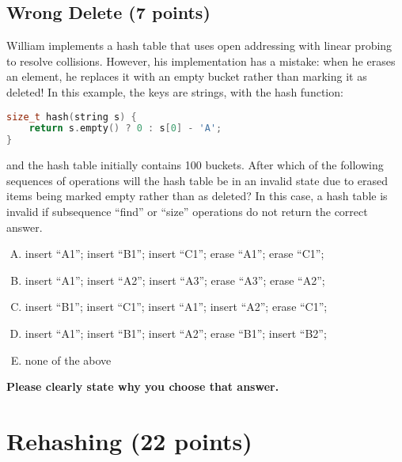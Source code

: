 \documentclass[11pt]{exam}
\begin{document}
\begin{solution}
\end{solution}

\subsection{Wrong Delete (7 points)}
William implements a hash table that uses open addressing with linear probing to resolve collisions. However, his implementation has a mistake: when he erases an element, he replaces it with an empty bucket rather than marking it as deleted! In this example, the keys are strings, with the hash function:
\begin{lstlisting}[language=c++]
size_t hash(string s) {
	return s.empty() ? 0 : s[0] - 'A';
}
\end{lstlisting}

and the hash table initially contains 100 buckets. After which of the following sequences of operations will the hash table be in an invalid state due to erased items being marked empty rather than as deleted? In this case, a hash table is invalid if subsequence “find” or “size” operations do not return the correct answer.
\begin{enumerate}[A.]
\item insert “A1”; insert “B1”; insert “C1”; erase “A1”; erase “C1”;
\item insert “A1”; insert “A2”; insert “A3”; erase “A3”; erase “A2”;
\item insert “B1”; insert “C1”; insert “A1”; insert “A2”; erase “C1”;
\item insert “A1”; insert “B1”; insert “A2”; erase “B1”; insert “B2”;
\item none of the above
\end{enumerate}

\textbf{Please clearly state why you choose that answer.}
\begin{solution}
\end{solution}

\section{Rehashing (22 points)}
\end{document}
